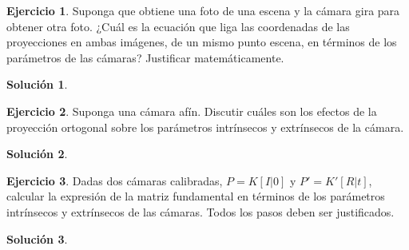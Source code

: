 \documentclass[a4paper, 11pt]{article}
\theoremstyle{definition}
\newtheorem{ejercicio}{Ejercicio}
\newtheorem*{solucion}{Solución}
\theoremstyle{theorem}
\begin{document}
    \begin{ejercicio}
        Suponga que obtiene una foto de una escena y la cámara gira para obtener otra foto. ¿Cuál es la ecuación que liga las coordenadas de las proyecciones en ambas imágenes, de un mismo punto escena, en términos de los parámetros de las cámaras? Justificar matemáticamente.
    \end{ejercicio}

    \begin{solucion}

    \end{solucion}

    \begin{ejercicio}
        Suponga una cámara afín. Discutir cuáles son los efectos de la proyección ortogonal sobre los parámetros intrínsecos y extrínsecos de la cámara.
    \end{ejercicio}

    \begin{solucion}

    \end{solucion}

    \begin{ejercicio}
        Dadas dos cámaras calibradas, $P=K[I|0]$ y $P'=K'[R|t]$, calcular la expresión de la matriz fundamental en términos de los parámetros intrínsecos y extrínsecos de las cámaras. Todos los pasos deben ser justificados.
    \end{ejercicio}

    \begin{solucion}

    \end{solucion}
\end{document}
